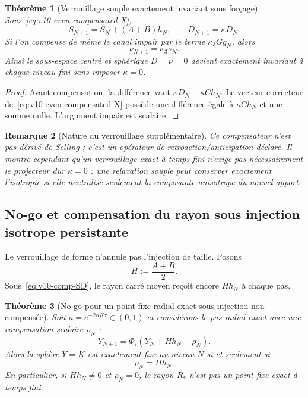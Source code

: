 \documentclass[11pt,a4paper]{article}
\newtheorem{theorem}{Théorème}[section]
\newtheorem{remark}[theorem]{Remarque}
\begin{document}
\begin{theorem}[Verrouillage souple exactement invariant sous forçage]\label{thm:v10-exact-soft-lock}
Sous~\eqref{eq:v10-even-compensated-X},
\begin{equation}\label{eq:v10-comp-SD}
 \boxed{
 S_{N+1}=S_N+(A+B)h_N,
 \qquad
 D_{N+1}=\kappa D_N.}
\end{equation}
Si l'on compense de même le canal impair par le terme $\kappa_3Gg_N$, alors
\begin{equation}\label{eq:v10-comp-odd}
 \boxed{\nu_{N+1}=\kappa_3\nu_N.}
\end{equation}
Ainsi le sous-espace centré et sphérique $D=\nu=0$ devient exactement invariant à chaque niveau fini sans imposer $\kappa=0$.
\end{theorem}

\begin{proof}
Avant compensation, la différence vaut $\kappa D_N+\kappa Ch_N$. Le vecteur correcteur de~\eqref{eq:v10-even-compensated-X} possède une différence égale à $\kappa Ch_N$ et une somme nulle. L'argument impair est scalaire.
\end{proof}

\begin{remark}[Nature du verrouillage supplémentaire]
Ce compensateur n'est pas dérivé de Selling ; c'est un opérateur de rétroaction/anticipation déclaré. Il montre cependant qu'un verrouillage exact à temps fini n'exige pas nécessairement le projecteur dur $\kappa=0$ : une relaxation souple peut conserver exactement l'isotropie si elle neutralise seulement la composante anisotrope du nouvel apport.
\end{remark}

\subsection{No-go et compensation du rayon sous injection isotrope persistante}

Le verrouillage de forme n'annule pas l'injection de taille. Posons
\begin{equation}\label{eq:v10-H}
 H:=\frac{A+B}{2}.
\end{equation}
Sous~\eqref{eq:v10-comp-SD}, le rayon carré moyen reçoit encore $Hh_N$ à chaque pas.

\begin{theorem}[No-go pour un point fixe radial exact sous injection non compensée]\label{thm:v10-radial-forcing-nogo}
Soit $a=e^{-2\alpha K\tau}\in(0,1)$ et considérons le pas radial exact avec une compensation scalaire $\rho_N$ :
\begin{equation}\label{eq:v10-forced-Phi}
 Y_{N+1}=\Phi_\tau(Y_N+Hh_N-\rho_N).
\end{equation}
Alors la sphère $Y=K$ est exactement fixe au niveau $N$ si et seulement si
\begin{equation}\label{eq:v10-radial-comp-iff}
 \boxed{\rho_N=Hh_N.}
\end{equation}
En particulier, si $Hh_N\ne0$ et $\rho_N=0$, le rayon $R_*$ n'est pas un point fixe exact à temps fini.
\end{theorem}
\end{document}
